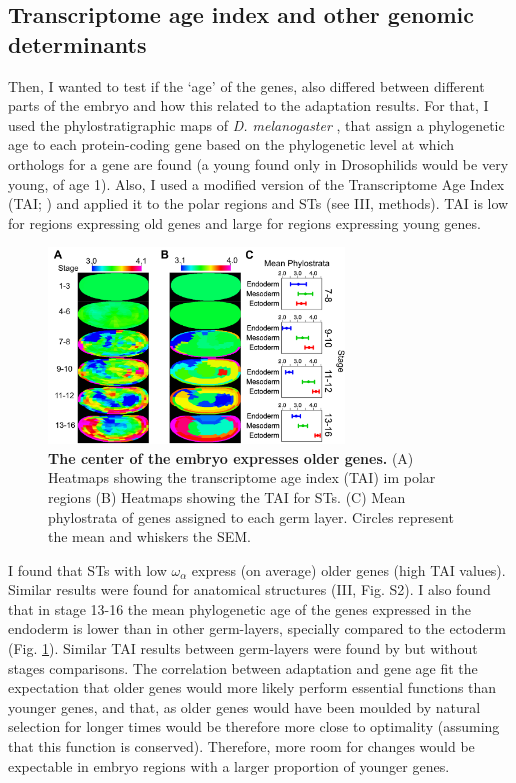 \subsection{Transcriptome age index and other genomic determinants}
Then, I wanted to test if the `age' of the genes, also differed between different parts of the embryo and how this related to the adaptation results. For that, I used the phylostratigraphic maps of \textit{D. melanogaster} \citep{Drost2015}, that assign a phylogenetic age to each protein-coding gene based on the phylogenetic level at which orthologs for a gene are found (a young found only in Drosophilids would be very young, of age 1). Also, I used a modified version of the Transcriptome Age Index (TAI; \citealp{Domazet-Loso2010}) and applied it to the polar regions and STs (see III, methods). TAI is low for regions expressing old genes and large for regions expressing young genes.
%
\begin{figure}[h]
  \includegraphics[width=0.7\textwidth]{./Images/Art-III/TAI.png}
  \centering
  \caption{\textbf{The center of the embryo expresses older genes.}
   (A) Heatmaps showing the transcriptome age index (TAI) im polar regions (B) Heatmaps showing the TAI for STs. (C) Mean phylostrata of genes assigned to each germ layer. Circles represent the mean and whiskers the SEM.
  }
  \label{fig:Art-III-TAI}
\end{figure}
%
I found that STs with low $\omega_{\alpha}$ express (on average) older genes (high TAI values). Similar results were found for anatomical structures (III, Fig. S2).
%
I also found that in stage 13-16 the mean phylogenetic age of the genes expressed in the endoderm is lower than in other germ-layers, specially compared to the ectoderm (Fig. \ref{fig:Art-III-TAI}).
Similar TAI results between germ-layers were found by \citet{Domazet-Loso2007} but without stages comparisons.
The correlation between adaptation and gene age fit the expectation that older genes would more likely perform essential functions than younger genes, and that, as older genes would have been moulded by natural selection for longer times would be therefore more close to optimality (assuming that this function is conserved). Therefore, more room for changes would be expectable in embryo regions with a larger proportion of younger genes. 

